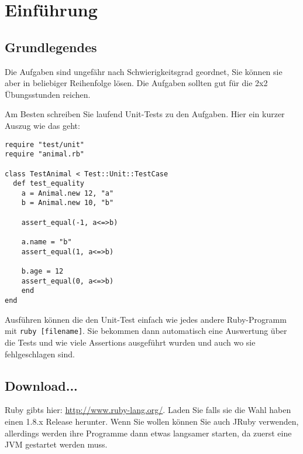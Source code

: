 \documentclass[a4paper,11pt,oneside]{scrbook}
\begin{document}
\renewcommand{\theequation}{\thesection.\arabic}
\setcapindent*{1em}


\chapter{Einführung} %
\label{cha:einführung}

\section{Grundlegendes} %
\label{sec:Grundlegendes}
Die Aufgaben sind ungefähr nach Schwierigkeitsgrad geordnet, Sie können sie aber in beliebiger Reihenfolge lösen. Die Aufgaben sollten gut für die 2x2 Übungsstunden reichen.

Am Besten schreiben Sie laufend Unit-Tests zu den Aufgaben. Hier ein kurzer Auszug wie das geht:

\begin{lstlisting}
require "test/unit"
require "animal.rb"

class TestAnimal < Test::Unit::TestCase
  def test_equality
    a = Animal.new 12, "a"
    b = Animal.new 10, "b"
    
    assert_equal(-1, a<=>b)
    
    a.name = "b"
    assert_equal(1, a<=>b)
    
    b.age = 12
    assert_equal(0, a<=>b)
    end
end
\end{lstlisting}

Ausführen können die den Unit-Test einfach wie jedes andere Ruby-Programm mit \texttt{ruby [filename]}. Sie bekommen dann automatisch eine Auswertung über die Tests und wie viele Assertions ausgeführt wurden und auch wo sie fehlgeschlagen sind.




\section{Download...} %
\label{sec:download_}
Ruby gibts hier: \url{http://www.ruby-lang.org/}. Laden Sie falls sie die Wahl haben einen 1.8.x Release herunter. Wenn Sie wollen können Sie auch JRuby verwenden, allerdings werden ihre Programme dann etwas langsamer starten, da zuerst eine JVM gestartet werden muss.
\end{document}

